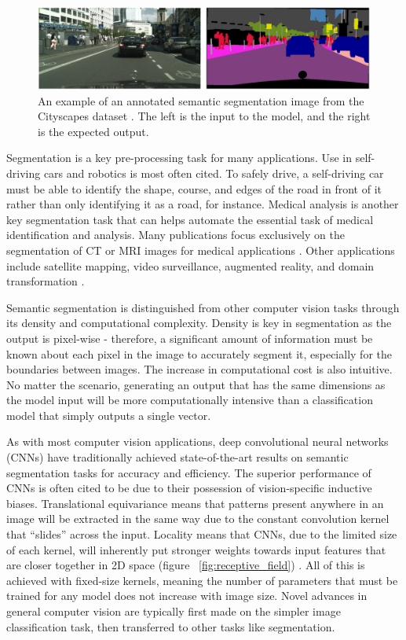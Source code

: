 \documentclass[a4paper,12pt]{report}
\begin{document}
    \begin{figure}[h]
        \centering
        \includegraphics[width=\textwidth]{res/cityscapes-segmentation-sample.png}
        \caption{An example of an annotated semantic segmentation image from the Cityscapes dataset \cite{cordts_cityscapes_2016}. The left is the input to the model, and the right is the expected output.}
        \label{fig:convolution}
    \end{figure}
    
    Segmentation is a key pre-processing task for many applications. Use in self-driving cars and robotics is most often cited. To safely drive, a self-driving car must be able to identify the shape, course, and edges of the road in front of it rather than only identifying it as a road, for instance. Medical analysis is another key segmentation task that can helps automate the essential task of medical identification and analysis. Many publications focus exclusively on the segmentation of CT or MRI images for medical applications \cite{hesamian_deep_2019}. Other applications include satellite mapping, video surveillance, augmented reality, and domain transformation \cite{richter_enhancing_2021}.
    
    Semantic segmentation is distinguished from other computer vision tasks through its density and computational complexity. Density is key in segmentation as the output is pixel-wise - therefore, a significant amount of information must be known about each pixel in the image to accurately segment it, especially for the boundaries between images. The increase in computational cost is also intuitive. No matter the scenario, generating an output that has the same dimensions as the model input will be more computationally intensive than a classification model that simply outputs a single vector.
    
    As with most computer vision applications, deep convolutional neural networks (CNNs) have traditionally achieved state-of-the-art results on semantic segmentation tasks for accuracy and efficiency. The superior performance of CNNs is often cited to be due to their possession of vision-specific inductive biases. Translational equivariance means that patterns present anywhere in an image will be extracted in the same way due to the constant convolution kernel that “slides” across the input. Locality means that CNNs, due to the limited size of each kernel, will inherently put stronger weights towards input features that are closer together in 2D space (figure ~\ref{fig:receptive_field}) \cite{zhang_dive_2019}. All of this is achieved with fixed-size kernels, meaning the number of parameters that must be trained for any model does not increase with image size. Novel advances in general computer vision are typically first made on the simpler image classification task, then transferred to other tasks like segmentation.
    
\end{document}
